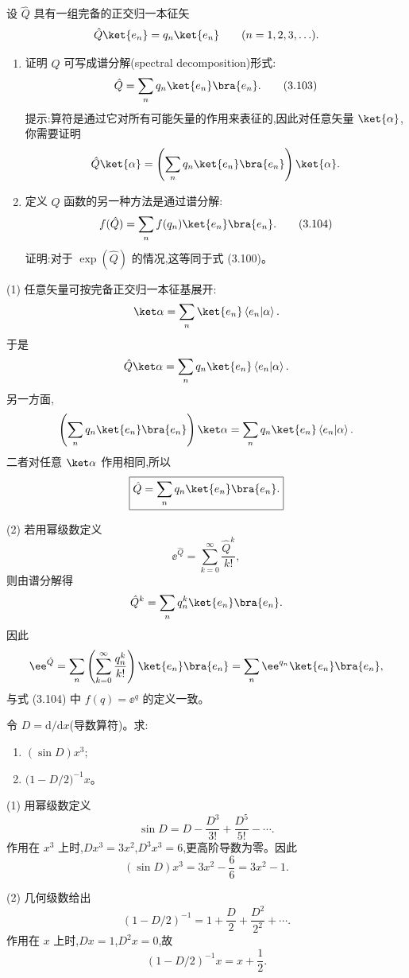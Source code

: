 \begin{question}
设 $\hat Q$ 具有一组完备的正交归一本征矢
\[
\hat Q\ket{e_n}=q_n\ket{e_n}\qquad(n=1,2,3,\ldots).
\]
\begin{enumerate}
\item 证明 $\hat Q$ 可写成谱分解(spectral decomposition)形式:
\[
\hat Q=\sum_n q_n\ket{e_n}\bra{e_n}.\tag{3.103}
\]
提示:算符是通过它对所有可能矢量的作用来表征的,因此对任意矢量 $\ket{\alpha}$,你需要证明
\[
\hat Q\ket{\alpha}=\left(\sum_n q_n\ket{e_n}\bra{e_n}\right)\ket{\alpha}.
\]
\item 定义 $\hat Q$ 函数的另一种方法是通过谱分解:
\[
f(\hat Q)=\sum_n f(q_n)\ket{e_n}\bra{e_n}.\tag{3.104}
\]
证明:对于 $\exp(\hat Q)$ 的情况,这等同于式 (3.100)。
\end{enumerate}

\par\smallskip
{}

\begin{solution}
(1) 任意矢量可按完备正交归一本征基展开:
\[
\ket\alpha=\sum_n \ket{e_n}\left\langle e_n|\alpha \right\rangle.
\]
于是
\[
\hat Q\ket\alpha=\sum_n q_n\ket{e_n}\left\langle e_n|\alpha \right\rangle.
\]
另一方面,
\[
\left(\sum_n q_n\ket{e_n}\bra{e_n}\right)\ket\alpha
=\sum_n q_n\ket{e_n}\left\langle e_n|\alpha \right\rangle.
\]
二者对任意 $\ket\alpha$ 作用相同,所以
\[
\boxed{\hat Q=\sum_n q_n\ket{e_n}\bra{e_n}.}
\]

(2) 若用幂级数定义
\[
\ee^{\hat Q}=\sum_{k=0}^{\infty}\frac{\hat Q^k}{k!},
\]
则由谱分解得
\[
\hat Q^k=\sum_n q_n^k\ket{e_n}\bra{e_n}.
\]
因此
\[
\ee^{\hat Q}=\sum_n\left(\sum_{k=0}^{\infty}\frac{q_n^k}{k!}\right)
\ket{e_n}\bra{e_n}
=\sum_n \ee^{q_n}\ket{e_n}\bra{e_n},
\]
与式 (3.104) 中 $f(q)=\ee^q$ 的定义一致。
\end{solution}
\end{question}

\begin{question}
令 $D=\mathrm d/\mathrm dx$(导数算符)。求:
\begin{enumerate}
\item $(\sin D)x^3$;
\item $\bigl(1-D/2\bigr)^{-1}x$。
\end{enumerate}
\begin{solution}
(1) 用幂级数定义
\[
\sin D=D-\frac{D^3}{3!}+\frac{D^5}{5!}-\cdots.
\]
作用在 $x^3$ 上时,$D x^3=3x^2$,$D^3x^3=6$,更高阶导数为零。因此
\[
(\sin D)x^3=3x^2-\frac{6}{6}=\boxed{3x^2-1}.
\]

(2) 几何级数给出
\[
(1-D/2)^{-1}=1+\frac D2+\frac{D^2}{2^2}+\cdots.
\]
作用在 $x$ 上时,$Dx=1$,$D^2x=0$,故
\[
(1-D/2)^{-1}x=x+\frac12.
\]
\end{solution}
\end{question}

